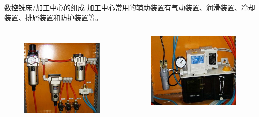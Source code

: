\documentclass[UTF8,zihao=-4]{ctexbeamer}
\begin{document}
\begin{frame}{数控铣床/加工中心的组成}
	加工中心常用的辅助装置有气动装置、润滑装置、冷却装置、排屑装置和防护装置等。  
\begin{columns}
	\begin{figure}
	\centering
	\includegraphics[width= \linewidth]{image/1-14}
	\label{fig:1-14}
	\end{figure}
	\begin{figure}
		\centering
		\includegraphics[width= \linewidth]{image/1-15}

\end{figure}
\end{columns}
\end{frame}
\end{document}
